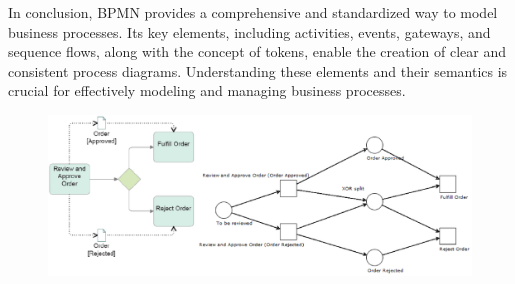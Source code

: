 In conclusion, BPMN provides a comprehensive and standardized way to model business processes. Its key elements, including activities, events, gateways, and sequence flows, along with the concept of tokens, enable the creation of clear and consistent process diagrams. Understanding these elements and their semantics is crucial for effectively modeling and managing business processes.
\begin{figure}[h!]
    \centering
    \includegraphics[width=0.75\linewidth]{capitolo 9/18.png}
\end{figure}